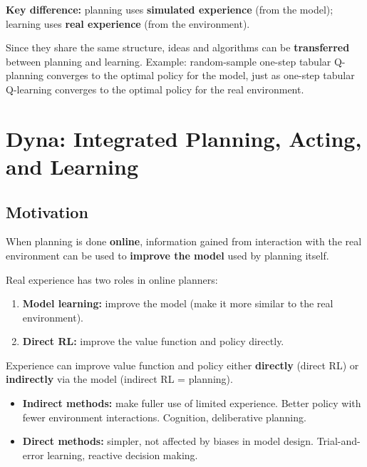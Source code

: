 \documentclass[11pt,a4paper]{article}
\theoremstyle{definition}
\theoremstyle{plain}
\theoremstyle{remark}
\begin{document}
\textbf{Key difference:} planning uses \textbf{simulated experience} (from the model); learning uses \textbf{real experience} (from the environment).

Since they share the same structure, ideas and algorithms can be \textbf{transferred} between planning and learning. Example: random-sample one-step tabular Q-planning converges to the optimal policy for the model, just as one-step tabular Q-learning converges to the optimal policy for the real environment.

\section{Dyna: Integrated Planning, Acting, and Learning}

\subsection{Motivation}

When planning is done \textbf{online}, information gained from interaction with the real environment can be used to \textbf{improve the model} used by planning itself.

Real experience has two roles in online planners:
\begin{enumerate}
    \item \textbf{Model learning:} improve the model (make it more similar to the real environment).
    \item \textbf{Direct RL:} improve the value function and policy directly.
\end{enumerate}

\begin{tcolorbox}[colback=blue!5!white, colframe=blue!60!black, title={Direct vs Indirect RL}]
Experience can improve value function and policy either \textbf{directly} (direct RL) or \textbf{indirectly} via the model (indirect RL = planning).
\begin{itemize}
    \item \textbf{Indirect methods:} make fuller use of limited experience. Better policy with fewer environment interactions. Cognition, deliberative planning.
    \item \textbf{Direct methods:} simpler, not affected by biases in model design. Trial-and-error learning, reactive decision making.
\end{itemize}
\end{tcolorbox}
\end{document}
